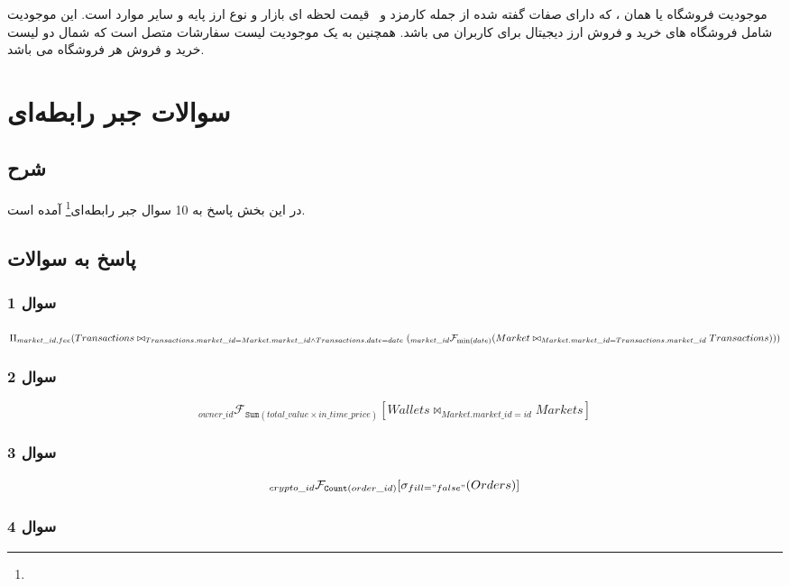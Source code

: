 \documentclass{book}
\begin{document}
        
        \subsection{}
        موجودیت فروشگاه یا همان ، که دارای صفات گفته شده از جمله کارمزد و  قیمت لحظه ای بازار و نوع ارز پایه و سایر موارد است. این موجودیت شامل فروشگاه های خرید و فروش ارز دیجیتال برای کاربران می باشد. همچنین به یک موجودیت لیست سفارشات متصل است که شمال دو لیست خرید و فروش هر فروشگاه می باشد.


        \chapter{سوالات جبر رابطه‌ای}
        \section{شرح}
        در این بخش پاسخ به 10 سوال جبر رابطه‌ای\footnote{} آمده است.
        \section{پاسخ به سوالات}
        \subsection{سوال 1}

        $\Pi_{market\_id, fee}(Transactions \\ \bowtie_{Transactions.market\_id = Market.market\_id \land Transactions.date = date}(\\
        _{market\_id}\mathcal{F}_{\min (date)} (\\
        Market \bowtie_{Market.market\_id = Transactions.market\_id} Transactions)))$

        \subsection{سوال 2}
        $$_{owner\_id}\mathcal{F}_{\mathtt{Sum}(total\_value \times in\_time\_price)} [ Wallets \bowtie_{Market.market\_id = id} Markets]$$

        \subsection{سوال 3}
        $$_{crypto\_id} \mathcal{F}_{\mathtt{Count}(order\_id)} [\sigma_{fill = "false"} (Orders)]$$

        \subsection{سوال 4}
\end{document}
